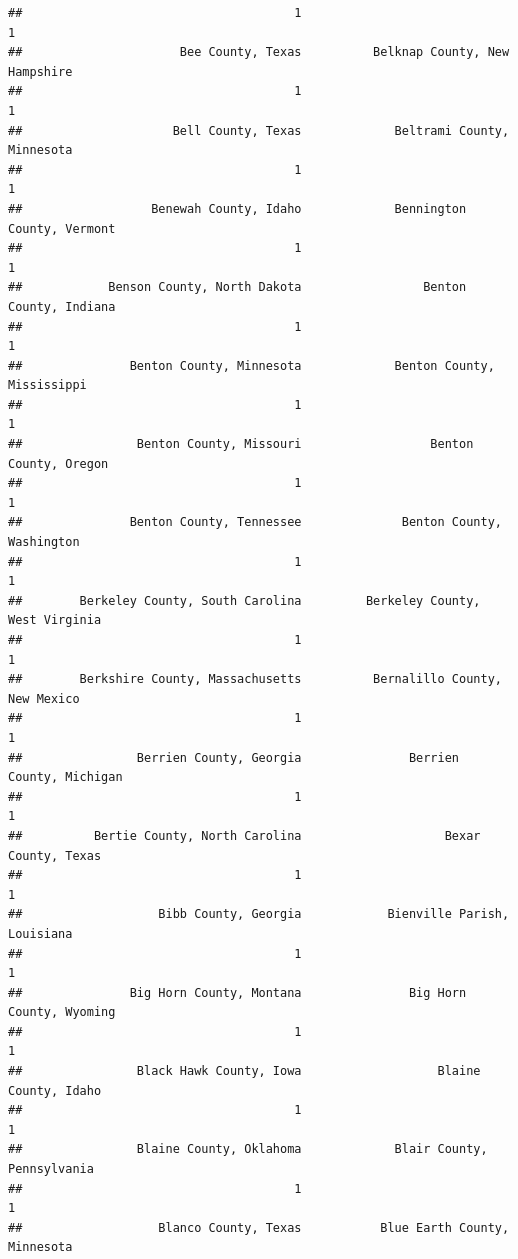 \documentclass[
]{article}
\begin{document}
\begin{verbatim}
##                                      1                                      1 
##                      Bee County, Texas          Belknap County, New Hampshire 
##                                      1                                      1 
##                     Bell County, Texas             Beltrami County, Minnesota 
##                                      1                                      1 
##                  Benewah County, Idaho             Bennington County, Vermont 
##                                      1                                      1 
##            Benson County, North Dakota                 Benton County, Indiana 
##                                      1                                      1 
##               Benton County, Minnesota             Benton County, Mississippi 
##                                      1                                      1 
##                Benton County, Missouri                  Benton County, Oregon 
##                                      1                                      1 
##               Benton County, Tennessee              Benton County, Washington 
##                                      1                                      1 
##        Berkeley County, South Carolina         Berkeley County, West Virginia 
##                                      1                                      1 
##        Berkshire County, Massachusetts          Bernalillo County, New Mexico 
##                                      1                                      1 
##                Berrien County, Georgia               Berrien County, Michigan 
##                                      1                                      1 
##          Bertie County, North Carolina                    Bexar County, Texas 
##                                      1                                      1 
##                   Bibb County, Georgia            Bienville Parish, Louisiana 
##                                      1                                      1 
##               Big Horn County, Montana               Big Horn County, Wyoming 
##                                      1                                      1 
##                Black Hawk County, Iowa                   Blaine County, Idaho 
##                                      1                                      1 
##                Blaine County, Oklahoma             Blair County, Pennsylvania 
##                                      1                                      1 
##                   Blanco County, Texas           Blue Earth County, Minnesota 

\end{verbatim}
\end{document}

